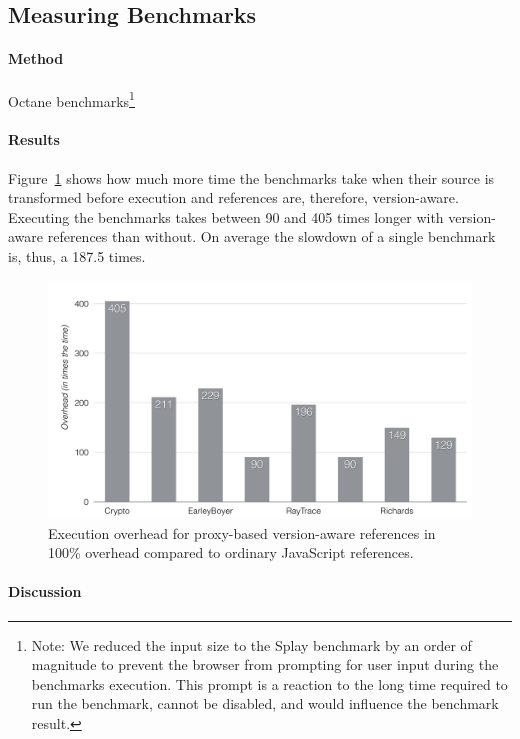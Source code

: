 \subsection{Measuring Benchmarks}

\paragraph{Method}
Octane benchmarks\footnote{Note: We reduced the input size to the Splay benchmark by an order of magnitude to prevent the browser from prompting for user input during the benchmarks execution. This prompt is a reaction to the long time required to run the benchmark, cannot be disabled, and would influence the benchmark result.}

\paragraph{Results}
Figure~\ref{fig:ExecutionOverhead} shows how much more time the benchmarks take when their source is transformed before execution and references are, therefore, version-aware.
Executing the benchmarks takes between 90 and 405 times longer with version-aware references than without.
On average the slowdown of a single benchmark is, thus, a 187.5 times.

\begin{figure}[h]
    \centering
    \includegraphics[width=\textwidth]{figures/6_evaluation/2_executionOverhead.pdf}
    \caption{Execution overhead for proxy-based version-aware references in 100\% overhead compared to ordinary JavaScript references.}
    \label{fig:ExecutionOverhead}
\end{figure}

\paragraph{Discussion}



